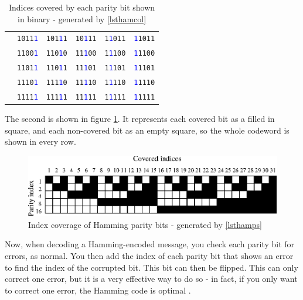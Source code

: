 \documentclass[a4paper,11pt]{article}
\begin{document}
\begin{table}[H]
\begin{center}
\begin{tabular}{l|rrrrr}
    & \texttt{1011\textcolor{blue}{1}} & \texttt{101\textcolor{blue}{1}1} & \texttt{10\textcolor{blue}{1}11} & \texttt{1\textcolor{blue}{1}011} & \texttt{\textcolor{blue}{1}1011} \\
    & \texttt{1100\textcolor{blue}{1}} & \texttt{110\textcolor{blue}{1}0} & \texttt{11\textcolor{blue}{1}00} & \texttt{1\textcolor{blue}{1}100} & \texttt{\textcolor{blue}{1}1100} \\
    & \texttt{1101\textcolor{blue}{1}} & \texttt{110\textcolor{blue}{1}1} & \texttt{11\textcolor{blue}{1}01} & \texttt{1\textcolor{blue}{1}101} & \texttt{\textcolor{blue}{1}1101} \\
    & \texttt{1110\textcolor{blue}{1}} & \texttt{111\textcolor{blue}{1}0} & \texttt{11\textcolor{blue}{1}10} & \texttt{1\textcolor{blue}{1}110} & \texttt{\textcolor{blue}{1}1110} \\
    & \texttt{1111\textcolor{blue}{1}} & \texttt{111\textcolor{blue}{1}1} & \texttt{11\textcolor{blue}{1}11} & \texttt{1\textcolor{blue}{1}111} & \texttt{\textcolor{blue}{1}1111} \\
    \bottomrule
\end{tabular}
\caption{Indices covered by each parity bit shown in binary - generated by
         \ref{lsthamcol}}
\label{tab:hamming-binary}
\end{center}
\end{table}

    The second is shown in figure \ref{fighamming}. It represents each covered
    bit as a filled in square, and each non-covered bit as an empty square, so
    the whole codeword is shown in every row.

\begin{figure}[H]
\begin{center}
\includegraphics{../psfiles/hamming_visualisation.eps}
\end{center}
\caption{Index coverage of Hamming parity bits - generated by \ref{lsthamps}}
\label{fighamming}
\end{figure}

    Now, when decoding a Hamming-encoded message, you check each parity bit for
    errors, as normal. You then add the index of each parity bit that shows an
    error to find the index of the corrupted bit. This bit can then be flipped.
    This can only correct one error, but it is a very effective way to do so -
    in fact, if you only want to correct one error, the Hamming code is optimal
    \cite{Codes1950Hamming,HammingCodes1997Battacharryya}.
\end{document}

